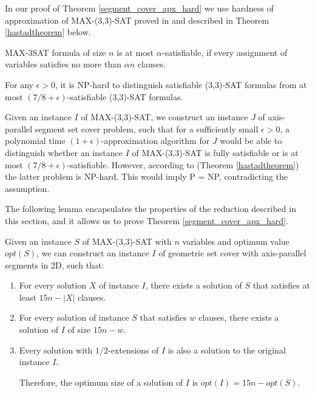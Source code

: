 In our proof of Theorem \ref{segment_cover_apx_hard} we use
hardness of approximation of MAX-(3,3)-SAT proved
in \cite{hastad} and described in
Theorem \ref{hastadtheorem} below.

\begin{defi}
MAX-3SAT formula of size $n$ is at most $\alpha$-satisfiable, if
every assignment of variables satisfies no more than $\alpha n$
clauses. 
\end{defi}

\begin{tw}{
	\label{hastadtheorem}
	\textbf{\cite{hastad}}
	
	For any $\epsilon > 0$, it is NP-hard to distinguish satisfiable
	(3,3)-SAT formulas from
	at most
	\linebreak\mbox{$(7/8 + \epsilon)$-satisfiable}
	(3,3)-SAT formulas.
}\end{tw}


Given an instance $I$ of MAX-(3,3)-SAT,
we construct an instance $J$ of 
axis-parallel segment set cover problem,
such that for a sufficiently small $\epsilon > 0$,
a polynomial time $(1+\epsilon)$-approximation algorithm for $J$
would be able to distinguish  whether an instance $I$ of MAX-(3,3)-SAT
is fully satisfiable
or is at most $(7/8 + \epsilon)$-satisfiable.
However, according to (Theorem \ref{hastadtheorem}) the latter problem
is NP-hard.
This would imply P = NP, contradicting the assumption.

The following lemma encapsulates the properties
of the reduction described in this section,
and it allows us to prove Theorem \ref{segment_cover_apx_hard}.

\begin{lemma}{
	\label{apxconstruction}
	Given an instance $S$ of  MAX-(3,3)-SAT 
	with $n$ variables and optimum value $opt(S)$,
	we can construct an instance $I$ of geometric set cover with
	axis-parallel segments in 2D, such that:
	\begin{enumerate}[label={(\arabic*)}]
	\item For every solution $X$ of instance $I$,
	there exists a solution of $S$ that satisfies at least  $15n - |X|$
	clauses.
	
	\item For every solution of instance $S$ that satisfies $w$ clauses,
	there exists a solution of $I$ of size $15n - w$.
	
	\item Every solution with $1/2$-extensions of $I$
	is also a solution to the original instance $I$.
		
	Therefore, the optimum size of a solution of $I$
	is $opt(I) = 15n - opt(S)$. 
	\end{enumerate}
	
}\end{lemma}


